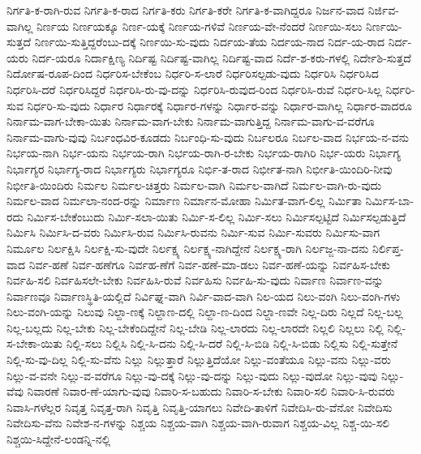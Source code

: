 {ನಿರ್ಗತಿ-ಕ-ರಾಗಿ-ರುವ
ನಿರ್ಗತಿ-ಕ-ರಾದ
ನಿರ್ಗತಿ-ಕರು
ನಿರ್ಗತಿ-ಕರೇ
ನಿರ್ಗತಿ-ಕ-ವಾಗಿದ್ದರೂ
ನಿರ್ಜನ-ವಾದ
ನಿರ್ಜಿವ-ವಾಗಿಲ್ಲ
ನಿರ್ಣಯ
ನಿರ್ಣಯಕ್ಕೂ
ನಿರ್ಣ-ಯಕ್ಕೆ
ನಿರ್ಣಯ-ಗಳಿವೆ
ನಿರ್ಣಯ-ವೇ-ನೆಂದರೆ
ನಿರ್ಣಯಿ-ಸಲು
ನಿರ್ಣಯಿ-ಸುತ್ತದೆ
ನಿರ್ಣಯಿ-ಸುತ್ತಿದ್ದರೆಂಬು-ದಕ್ಕೆ
ನಿರ್ಣಯಿ-ಸು-ವುದು
ನಿರ್ದಯ-ತೆಯ
ನಿರ್ದಯ-ನಾದ
ನಿರ್ದ-ಯ-ರಾದ
ನಿರ್ದ-ಯರು
ನಿರ್ದ-ಯರೂ
ನಿರ್ದಾಕ್ಷಿಣ್ಯ
ನಿರ್ದಿಷ್ಟ
ನಿರ್ದಿಷ್ಟ-ವಾಗಿಲ್ಲ
ನಿರ್ದಿಷ್ಟ-ವಾದ
ನಿರ್ದೆ-ಶ-ಕರು-ಗಳಲ್ಲಿ
ನಿರ್ದೇಶಿ-ಸುತ್ತದೆ
ನಿರ್ದೋಷ-ರೂಪ-ದಿಂದ
ನಿರ್ಧರಿಸ-ಬೇಕೆಂಬ
ನಿರ್ಧರಿ-ಸ-ಲಾರೆ
ನಿರ್ಧರಿಸಲ್ಪಡು-ವುದು
ನಿರ್ಧರಿಸಿ
ನಿರ್ಧರಿಸಿದ
ನಿರ್ಧರಿಸಿ-ದರೆ
ನಿರ್ಧರಿಸಿದ್ದರೆ
ನಿರ್ಧರಿಸಿ-ರು-ವು-ದನ್ನು
ನಿರ್ಧರಿಸಿ-ರುವುದ-ರಿಂದ
ನಿರ್ಧರಿಸಿ-ರುವೆ
ನಿರ್ಧರಿ-ಸಿಲ್ಲ
ನಿರ್ಧರಿ-ಸುವ
ನಿರ್ಧರಿ-ಸು-ವುದು
ನಿರ್ಧಾರ
ನಿರ್ಧಾರಕ್ಕೆ
ನಿರ್ಧಾರ-ಗಳನ್ನು
ನಿರ್ಧಾರ-ವನ್ನು
ನಿರ್ಧಾರ-ವಾಗಿಲ್ಲ
ನಿರ್ಧಾರ-ವಾದರೂ
ನಿರ್ನಾಮ-ವಾಗ-ಬೇಕಾ-ಯಿತು
ನಿರ್ನಾಮ-ವಾಗ-ಬೇಕು
ನಿರ್ನಾಮ-ವಾಗುತ್ತಿದ್ದ
ನಿರ್ನಾಮ-ವಾಗು-ವ-ವರೆಗೂ
ನಿರ್ನಾಮ-ವಾಗು-ವುವು
ನಿರ್ಬಂಧವಿರ-ಕೂಡದು
ನಿರ್ಬಂಧಿ-ಸು-ವುದು
ನಿರ್ಬಲರೂ
ನಿರ್ಬಲ-ವಾದ
ನಿರ್ಭಯ-ನ-ವನು
ನಿರ್ಭಯ-ನಾಗಿ
ನಿರ್ಭ-ಯನು
ನಿರ್ಭಯ-ರಾಗಿ
ನಿರ್ಭಯ-ರಾಗಿ-ರ-ಬೇಕು
ನಿರ್ಭಯ-ರಾಗಿರಿ
ನಿರ್ಭ-ಯರು
ನಿರ್ಭಾಗ್ಯ
ನಿರ್ಭಾಗ್ಯರ
ನಿರ್ಭಾಗ್ಯ-ರಾದ
ನಿರ್ಭಾಗ್ಯರು
ನಿರ್ಭಾಗ್ಯರೂ
ನಿರ್ಭಿ-ತ-ರಾದ
ನಿರ್ಭೀತ-ನಾಗಿ
ನಿರ್ಭೀತಿ-ಯಿಂದಿರಿ-ನೀವು
ನಿರ್ಭೀತಿ-ಯಿಂದಿರು
ನಿರ್ಮಲ
ನಿರ್ಮಲ-ಚಿತ್ತರು
ನಿರ್ಮಲ-ವಾಗಿ
ನಿರ್ಮಲ-ವಾಗಿದೆ
ನಿರ್ಮಲ-ವಾಗಿ-ರು-ವುದು
ನಿರ್ಮಲ-ವಾದ
ನಿರ್ಮಲಾ-ನಂದ-ರನ್ನು
ನಿರ್ಮಾಣ
ನಿರ್ಮಾನ-ಮೋಹಾ
ನಿರ್ಮಿತ-ವಾಗ-ಲಿಲ್ಲ
ನಿರ್ಮಿತಾ
ನಿರ್ಮಿಸ-ಬಾ-ರದು
ನಿರ್ಮಿಸ-ಬೇಕೆಂಬುದು
ನಿರ್ಮಿ-ಸಲಾ-ಯಿತು
ನಿರ್ಮಿ-ಸ-ಲಿಲ್ಲ
ನಿರ್ಮಿ-ಸಲು
ನಿರ್ಮಿಸಲ್ಪಟ್ಟಿದೆ
ನಿರ್ಮಿಸಲ್ಪಡುತ್ತಿದೆ
ನಿರ್ಮಿಸಿ
ನಿರ್ಮಿಸಿ-ದ-ವರು
ನಿರ್ಮಿಸಿ-ರುವ
ನಿರ್ಮಿಸಿ-ರುವನು
ನಿರ್ಮಿ-ಸುವ
ನಿರ್ಮಿ-ಸುವರು
ನಿರ್ಮಿಸು-ವಾಗ
ನಿರ್ಮೂಲ
ನಿರ್ಲಕ್ಷಿಸಿ
ನಿರ್ಲಕ್ಷಿ-ಸು-ವುದೇ
ನಿರ್ಲಕ್ಷ್ಯ
ನಿರ್ಲಕ್ಷ್ಯ-ನಾಗಿದ್ದೇನೆ
ನಿರ್ಲಕ್ಷ್ಯ-ರಾಗಿ
ನಿರ್ಲಜ್ಜ-ನಾ-ದನು
ನಿರ್ಲಿಪ್ತ-ವಾದ
ನಿರ್ವ-ಹಣೆ
ನಿರ್ವ-ಹಣೆಗೂ
ನಿರ್ವಹ-ಣೆಗೆ
ನಿರ್ವ-ಹಣೆ-ಮಾ-ಡಲು
ನಿರ್ವ-ಹಣೆ-ಯನ್ನು
ನಿರ್ವಹಿಸ-ಬೇಕು
ನಿರ್ವಹಿ-ಸಲಿ
ನಿರ್ವಹಿಸಲೇ-ಬೇಕು
ನಿರ್ವಹಿಸಿ-ರುವೆ
ನಿರ್ವಹಿಸು
ನಿರ್ವಹಿ-ಸು-ವುದು
ನಿರ್ವಾಣ
ನಿರ್ವಾಣ-ವನ್ನು
ನಿರ್ವಾಣವೂ
ನಿರ್ವಾಣಸ್ಥಿತಿ-ಯಲ್ಲಿದೆ
ನಿರ್ವಿಘ್ನ-ವಾಗಿ
ನಿರ್ವಿ-ವಾದ-ವಾಗಿ
ನಿಲ-ಯದ
ನಿಲು-ವಂಗಿ
ನಿಲು-ವಂಗಿ-ಗಳು
ನಿಲು-ವಂಗಿ-ಯನ್ನು
ನಿಲುವು
ನಿಲ್ದಾ-ಣಕ್ಕೆ
ನಿಲ್ದಾಣ-ದಲ್ಲಿ
ನಿಲ್ದಾ-ಣ-ದಿಂದ
ನಿಲ್ದಾ-ಣವೇ
ನಿಲ್ಲ-ದಿರು
ನಿಲ್ಲದೆ
ನಿಲ್ಲ-ಬಲ್ಲ
ನಿಲ್ಲ-ಬಲ್ಲದು
ನಿಲ್ಲ-ಬೇಕು
ನಿಲ್ಲ-ಬೇಕೆಂದಿದ್ದೇನೆ
ನಿಲ್ಲ-ಬೇಡಿ
ನಿಲ್ಲ-ಲಾರದು
ನಿಲ್ಲ-ಲಾರದೇ
ನಿಲ್ಲಲಿ
ನಿಲ್ಲಲು
ನಿಲ್ಲಿ
ನಿಲ್ಲಿ-ಸ-ಬೇಕಾ-ಯಿತು
ನಿಲ್ಲಿ-ಸಲು
ನಿಲ್ಲಿಸಿ
ನಿಲ್ಲಿ-ಸಿ-ದನು
ನಿಲ್ಲಿ-ಸಿ-ದರೆ
ನಿಲ್ಲಿ-ಸಿ-ಬಿಡಿ
ನಿಲ್ಲಿ-ಸಿ-ಬಿಡು
ನಿಲ್ಲಿಸು
ನಿಲ್ಲಿ-ಸುತ್ತೇನೆ
ನಿಲ್ಲಿ-ಸು-ವು-ದಿಲ್ಲ
ನಿಲ್ಲಿ-ಸು-ವೆನು
ನಿಲ್ಲು
ನಿಲ್ಲುತ್ತಾರೆ
ನಿಲ್ಲುತ್ತಿದೆಯೋ
ನಿಲ್ಲು-ವಂತೆಯೂ
ನಿಲ್ಲು-ವನು
ನಿಲ್ಲು-ವರು
ನಿಲ್ಲು-ವ-ವನೇ
ನಿಲ್ಲು-ವ-ವರೆಗೂ
ನಿಲ್ಲು-ವು-ದಕ್ಕೆ
ನಿಲ್ಲು-ವು-ದನ್ನು
ನಿಲ್ಲು-ವುದು
ನಿಲ್ಲು-ವುದೋ
ನಿಲ್ಲು-ವುವು
ನಿಲ್ಲು-ವೆವು
ನಿವಾರಣೆ
ನಿವಾರ-ಣೆ-ಯಾಗು-ವುವು
ನಿವಾರಿ-ಸ-ಬಹುದು
ನಿವಾರಿ-ಸ-ಬೇಕು
ನಿವಾರಿ-ಸಲಿ
ನಿವಾರಿ-ಸಿ-ರುವರು
ನಿವಾಸಿ-ಗಳೆಲ್ಲರ
ನಿವೃತ್ತ
ನಿವೃತ್ತ-ರಾಗಿ
ನಿವೃತ್ತಿ
ನಿವೃತ್ತಿ-ಯಾಗಲು
ನಿವೇದಿ-ತಾಳಿಗೆ
ನಿವೇದಿಸಿ-ರು-ವೆನೋ
ನಿವೇದಿಸು
ನಿವೇದಿಸು-ವೆನು
ನಿವೇಶ-ನ-ಗಳನ್ನು
ನಿಶ್ಚಯ
ನಿಶ್ಚಯ-ವಾಗಿ
ನಿಶ್ಚಯ-ವಾಗಿ-ರುವಾಗ
ನಿಶ್ಚಯ-ವಿಲ್ಲ
ನಿಶ್ಚ-ಯಿ-ಸಲಿ
ನಿಶ್ಚಯಿ-ಸಿದ್ದೇನೆ-ಲಂಡನ್ನಿ-ನಲ್ಲಿ
}
